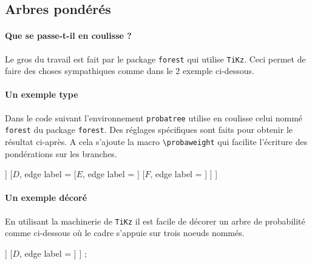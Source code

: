 \documentclass[12pt,a4paper]{article}
\begin{document}

\subsection{Arbres pondérés}

\paragraph{Que se passe-t-il en coulisse ?}

Le gros du travail est fait par le package \verb+forest+ qui utilise \verb+TiKz+. Ceci permet de faire des choses sympathiques comme dans le 2\ieme{} exemple ci-dessous.


\paragraph{Un exemple type}

Dans le code suivant l'environnement \verb+probatree+ utilise en coulisse celui nommé \verb+forest+ du package \verb+forest+. Des réglages spécifiques sont faits pour obtenir le résultat ci-après. A cela s'ajoute la macro \verb+\probaweight+ qui facilite l'écriture des pondérations sur les branches.

\begin{tcblisting}{}
\begin{probatree}
[
    [$A$, edge label = \probaweight{$a$}
        [$B$, edge label = \probaweight{$b$}]
        [$C$, edge label = \probaweight{$c$}]
    ]
    [$D$, edge label = 
        [$E$, edge label = ]
        [$F$, edge label = ]
    ]
]
\end{probatree}

\end{tcblisting}


\paragraph{Un exemple décoré}

En utilisant la machinerie de \verb+TiKz+ il est facile de décorer un arbre de probabilité comme ci-dessous où le cadre s'appuie sur trois noeuds nommés.

\begin{tcblisting}{}
\begin{probatree}
[
    [$A$, name = left, edge label = \probaweight{$a$}
        [$B$, name = topright, edge label = \probaweight{$b$}]
        [$C$, name = bottomright, edge label = \probaweight{$c$}]
    ]
    [$D$, edge label = ]
]
\node[draw = blue, thick, rounded corners, fit = (left)(topright)(bottomright)] {};
\end{probatree}

\end{tcblisting}
\end{document}
